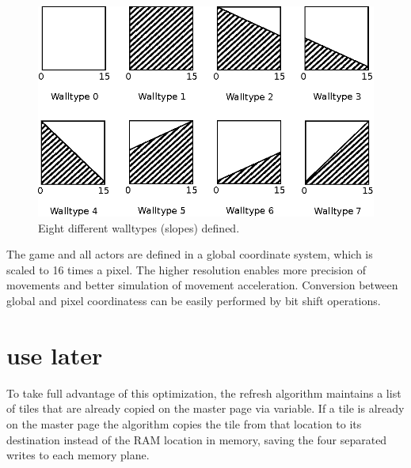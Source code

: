 \documentclass[book.tex]{subfiles}
\begin{document}
\begin{minipage}{\textwidth}
  
\end{minipage}
\label{wallclip_array}
\par
\begin{figure}[H]
  \centering
  \includegraphics[width=\textwidth]{imgs/drawings/walltype.eps}
  \caption{Eight different walltypes (slopes) defined.}
  \label{fig:walltype}
\end{figure}



\par
\begin{minipage}{\textwidth}
  
\end{minipage}
\label{wallclip_array}
\par



\pagebreak

The game and all actors are defined in a global coordinate system, which is scaled to 16 times a pixel. The higher resolution enables more precision of movements and better simulation of movement acceleration. Conversion between global and pixel coordinatess can be easily performed by bit shift operations.\\
\section{use later}
\begin{minipage}{\textwidth}
  
  \end{minipage}
  \label{ega_refresh}
  \par


\pagebreak

To take full advantage of this optimization, the refresh algorithm maintains a list of tiles that are already copied on the master page via  variable. If a tile is already on the master page the algorithm copies the tile from that location to its destination instead of the RAM location in memory, saving the four separated writes to each memory plane.\\
\end{document}
